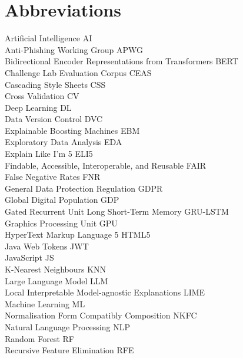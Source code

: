 
\section*{Abbreviations}

\large
Artificial Intelligence \hfill AI\\
Anti-Phishing Working Group \hfill APWG\\
Bidirectional Encoder Representations from Transformers \hfill BERT\\
Challenge Lab Evaluation Corpus \hfill CEAS\\
Cascading Style Sheets \hfill CSS\\
Cross Validation \hfill CV\\
Deep Learning \hfill DL\\
Data Version Control \hfill DVC\\
Explainable Boosting Machines \hfill EBM\\
Exploratory Data Analysis \hfill EDA\\
Explain Like I'm 5 \hfill ELI5\\
Findable, Accessible, Interoperable, and Reusable \hfill FAIR \\
False Negative Rates \hfill FNR\\
General Data Protection Regulation \hfill GDPR\\
Global Digital Population \hfill GDP\\
Gated Recurrent Unit Long Short-Term Memory \hfill GRU-LSTM\\
Graphics Processing Unit \hfill GPU\\
HyperText Markup Language 5 \hfill HTML5\\
Java Web Tokens \hfill JWT\\
JavaScript \hfill JS\\
K-Nearest Neighbours \hfill KNN\\
Large Language Model \hfill LLM\\
Local Interpretable Model-agnostic Explanations \hfill LIME\\
Machine Learning \hfill ML\\
Normalisation Form Compatibly Composition \hfill NKFC\\
Natural Language Processing \hfill NLP\\
Random Forest \hfill RF\\
Recursive Feature Elimination \hfill RFE\\
